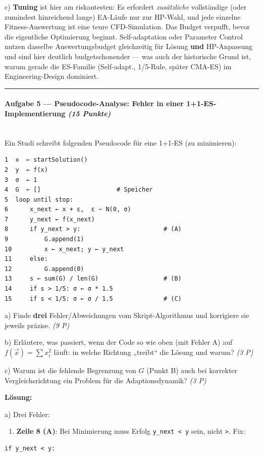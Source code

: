 \documentclass[11pt, a4paper]{article}
\begin{document}
c) \textbf{Tuning} ist hier am riskantesten: Es erfordert \textit{zusätzliche} vollständige (oder zumindest hinreichend lange) EA-Läufe nur zur HP-Wahl, und jede einzelne Fitness-Auswertung ist eine teure CFD-Simulation. Das Budget verpufft, bevor die eigentliche Optimierung beginnt. Self-adaptation oder Parameter Control nutzen dasselbe Auswertungsbudget gleichzeitig für Lösung \textbf{und} HP-Anpassung und sind hier deutlich budgetschonender — was auch der historische Grund ist, warum gerade die ES-Familie (Self-adapt., 1/5-Rule, später CMA-ES) im Engineering-Design dominiert.



\noindent\textcolor{rulegray}{\rule{\linewidth}{0.4pt}}


\paragraph{Aufgabe 5 — Pseudocode-Analyse: Fehler in einer 1+1-ES-Implementierung \textit{(15 Punkte)}}\mbox{}\\[2pt]

Ein Studi schreibt folgenden Pseudocode für eine 1+1-ES (zu minimieren):


\begin{lstlisting}
1  x  ← startSolution()
2  y  ← f(x)
3  σ  ← 1
4  G  ← []                     # Speicher
5  loop until stop:
6      x_next ← x + ε,  ε ~ N(0, σ)
7      y_next ← f(x_next)
8      if y_next > y:                       # (A)
9          G.append(1)
10         x ← x_next; y ← y_next
11     else:
12         G.append(0)
13     s ← sum(G) / len(G)                  # (B)
14     if s > 1/5: σ ← σ * 1.5
15     if s < 1/5: σ ← σ / 1.5              # (C)
\end{lstlisting}


a) Finde \textbf{drei} Fehler/Abweichungen vom Skript-Algorithmus und korrigiere sie jeweils präzise. \textit{(9 P)}


b) Erläutere, was passiert, wenn der Code so wie oben (mit Fehler A) auf $f(\vec x) = \sum x_i^2$ läuft: in welche Richtung „treibt“ die Lösung und warum? \textit{(3 P)}


c) Warum ist die fehlende Begrenzung von $G$ (Punkt B) auch bei korrekter Vergleichsrichtung ein Problem für die Adaptionsdynamik? \textit{(3 P)}


\textbf{Lösung:}


a) Drei Fehler:


\begin{enumerate}
  \item \textbf{Zeile 8 (A)}: Bei Minimierung muss Erfolg \texttt{y\_next < y} sein, nicht \texttt{>}. Fix:
\end{enumerate}
\begin{lstlisting}
if y_next < y:
\end{lstlisting}
\end{document}
